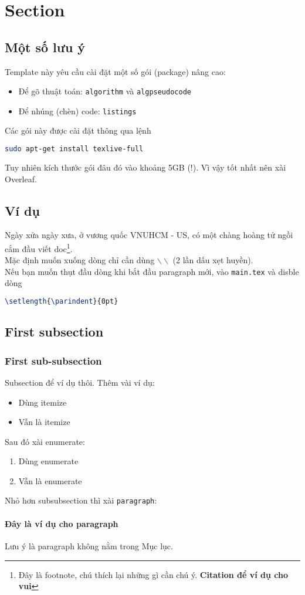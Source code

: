 \section{Section}

\subsection{Một số lưu ý}
Template này yêu cầu cài đặt một số gói (package) nâng cao:
\begin{itemize}
\item Để gõ thuật toán: \texttt{algorithm} và \texttt{algpseudocode}
\item Để nhúng (chèn) code: \texttt{listings}
\end{itemize}
Các gói này được cài đặt thông qua lệnh
\begin{lstlisting}[language=sh]
sudo apt-get install texlive-full
\end{lstlisting}
Tuy nhiên kích thước gói đâu đó vào khoảng 5GB (!). Vì vậy tốt nhất nên xài Overleaf.

\subsection{Ví dụ}
Ngày xửa ngày xưa, ở vương quốc VNUHCM - US, có một chàng hoàng tử ngồi cắm đầu viết doc\cite{greenwade93}\footnote{Đây là footnote, chú thích lại những gì cần chú ý. \textbf{Citation để ví dụ cho vui}}.\\
Mặc định muốn xuống dòng chỉ cần dùng $\backslash\backslash$  (2 lần dấu xẹt huyền).\\
Nếu bạn muốn thụt đầu dòng khi bắt đầu paragraph mới, vào \texttt{main.tex} và disble dòng
\begin{lstlisting}[language=tex]
\setlength{\parindent}{0pt}
\end{lstlisting}


\subsection{First subsection}
\subsubsection{First sub-subsection}
Subsection để ví dụ thôi. Thêm vài ví dụ:
\begin{itemize}
    \item Dùng itemize
    \item Vẫn là itemize
\end{itemize}
Sau đó xài enumerate:
\begin{enumerate}
    \item Dùng enumerate
    \item Vẫn là enumerate
\end{enumerate}
Nhỏ hơn subsubsection thì xài \texttt{paragraph}:

\paragraph{Đây là ví dụ cho paragraph}
Lưu ý là paragraph không nằm trong Mục lục.